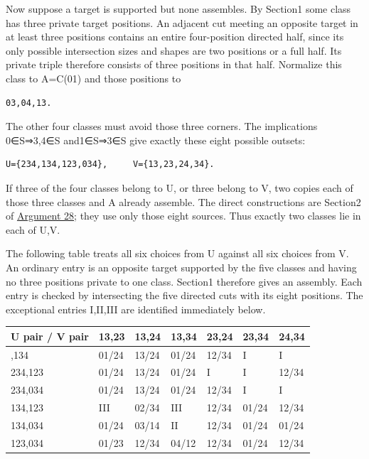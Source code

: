 \documentclass[
  10pt,
]{article}
\begin{document}
Now suppose a target is supported but none assembles. By Section1 some
class has three private target positions. An adjacent cut meeting an
opposite target in at least three positions contains an entire
four-position directed half, since its only possible intersection sizes
and shapes are two positions or a full half. Its private triple
therefore consists of three positions in that half. Normalize this class
to A=C(01) and those positions to

\begin{verbatim}
03,04,13.
\end{verbatim}

The other four classes must avoid those three corners. The implications
0∈S⇒3,4∈S and1∈S⇒3∈S give exactly these eight possible outsets:

\begin{verbatim}
U={234,134,123,034},     V={13,23,24,34}.
\end{verbatim}

If three of the four classes belong to U, or three belong to V, two
copies each of those three classes and A already assemble. The direct
constructions are Section2 of \protect\hyperlink{arg-28}{Argument 28};
they use only those eight sources. Thus exactly two classes lie in each
of U,V.

The following table treats all six choices from U against all six
choices from V. An ordinary entry is an opposite target supported by the
five classes and having no three positions private to one class.
Section1 therefore gives an assembly. Each entry is checked by
intersecting the five directed cuts with its eight positions. The
exceptional entries I,II,III are identified immediately below.

\begin{longtable}[]{@{}lllllll@{}}
\toprule\noalign{}
U pair / V pair & 13,23 & 13,24 & 13,34 & 23,24 & 23,34 & 24,34 \\
\midrule\noalign{}
\endhead
\bottomrule\noalign{}
\endlastfoot
234,134 & 01/24 & 13/24 & 01/24 & 12/34 & I & I \\
234,123 & 01/24 & 13/24 & 01/24 & I & I & 12/34 \\
234,034 & 01/24 & 13/24 & 01/24 & 12/34 & I & I \\
134,123 & III & 02/34 & III & 12/34 & 01/24 & 12/34 \\
134,034 & 01/24 & 03/14 & II & 12/34 & 01/24 & 01/24 \\
123,034 & 01/23 & 12/34 & 04/12 & 12/34 & 01/24 & 12/34 \\
\end{longtable}
\end{document}
